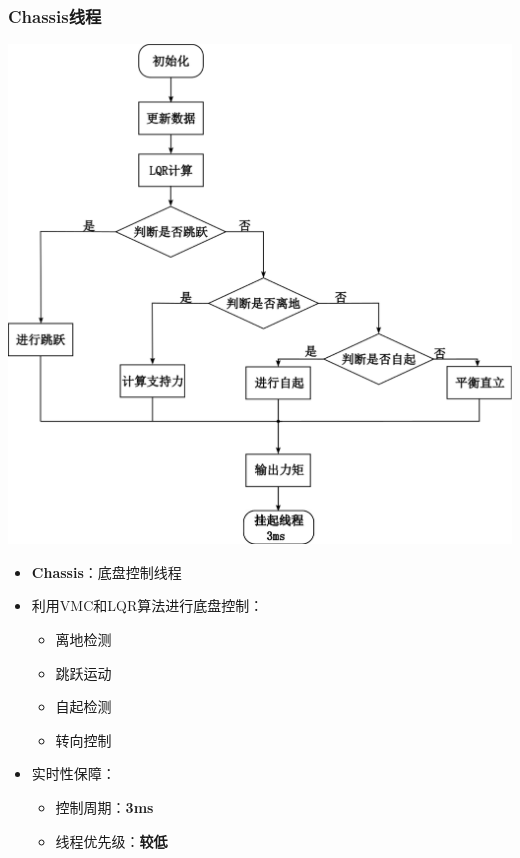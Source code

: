 \documentclass{beamer}
\begin{document}
	
	\begin{frame}
		\frametitle{Chassis线程}
			\begin{minipage}[t]{0.5\linewidth}
			\vspace{-\baselineskip} %
			\centering
			\includegraphics[width=1.2\linewidth]{img/chapter5/chassis.pdf} %
		\end{minipage}%
		\hfill %
		\begin{minipage}[t]{0.4\linewidth}
			\begin{itemize}
				\item \textbf{Chassis}：底盘控制线程
				\item 利用VMC和LQR算法进行底盘控制：
					\begin{itemize}
						\item 离地检测
						\item 跳跃运动
						\item 自起检测
						\item 转向控制
					\end{itemize}
				\item 实时性保障：
				\begin{itemize}
					\item 控制周期：\textbf{3ms}
					\item 线程优先级：\textbf{较低}
				\end{itemize}
			\end{itemize}
		\end{minipage}
	\end{frame}
	
\end{document}
